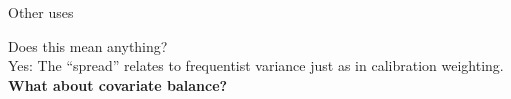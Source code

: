 
\begin{frame}[c]{Other uses}
\centering


Does this mean anything?\\
Yes: The ``spread'' relates to frequentist variance just as in calibration weighting.\\[1em]

{
\textbf{What about covariate balance?}
}

\splitpagenoline{
    \AlexanderWeightPlot{}
}{
    \LaxWeightPlot{}
}
\end{frame}

